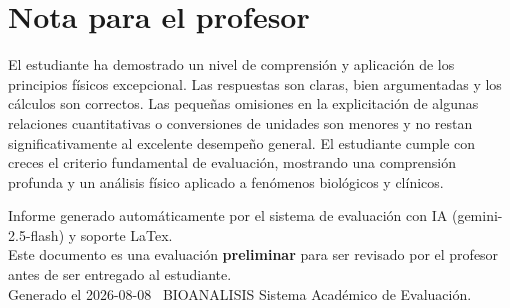 \documentclass[11pt,a4paper]{article}
\begin{document}
\section*{Nota para el profesor}
\begin{tcolorbox}[
  enhanced, breakable,
  colback=yellow!8, colframe=yellow!60!black,
  fonttitle=\bfseries, coltitle=black,
  title={Observaciones para revisión manual},
  top=4pt, bottom=4pt, left=8pt, right=8pt,
]
El estudiante ha demostrado un nivel de comprensión y aplicación de los principios físicos excepcional. Las respuestas son claras, bien argumentadas y los cálculos son correctos. Las pequeñas omisiones en la explicitación de algunas relaciones cuantitativas o conversiones de unidades son menores y no restan significativamente al excelente desempeño general. El estudiante cumple con creces el criterio fundamental de evaluación, mostrando una comprensión profunda y un análisis físico aplicado a fenómenos biológicos y clínicos.
\end{tcolorbox}

\vspace{12pt}
\begin{center}
  \footnotesize\color{gray}
  Informe generado automáticamente por el sistema de evaluación con IA (gemini-2.5-flash) y soporte LaTex. \\
  Este documento es una evaluación \textbf{preliminar} para ser revisado por el profesor antes de ser entregado al 
  estudiante. \\
  Generado el 2026-08-08 \textbullet\ BIOANALISIS Sistema Académico de Evaluación.
  \end{center}
\end{document}
